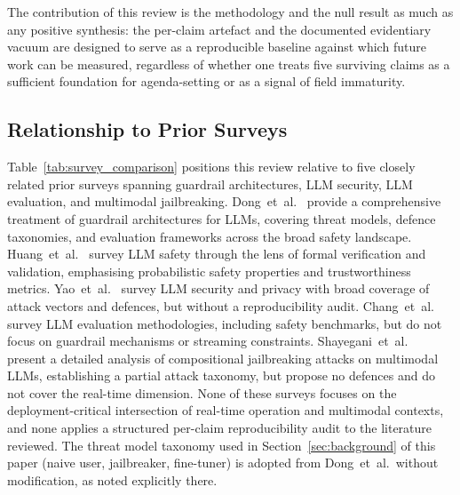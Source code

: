 \noindent The contribution of this review is the methodology and the null result
as much as any positive synthesis: the per-claim artefact and the documented
evidentiary vacuum are designed to serve as a reproducible baseline against which
future work can be measured, regardless of whether one treats five surviving claims
as a sufficient foundation for agenda-setting or as a signal of field immaturity.

\subsection{Relationship to Prior Surveys}

Table~\ref{tab:survey_comparison} positions this review relative to five closely
related prior surveys spanning guardrail architectures, LLM security, LLM evaluation,
and multimodal jailbreaking.
Dong~et~al.~\cite{dong2024building} provide a comprehensive treatment of guardrail
architectures for LLMs, covering threat models, defence taxonomies, and evaluation
frameworks across the broad safety landscape.
Huang~et~al.~\cite{huang2023survey} survey LLM safety through the lens of formal
verification and validation, emphasising probabilistic safety properties and
trustworthiness metrics.
Yao~et~al.~\cite{yao2023survey} survey LLM security and privacy with broad
coverage of attack vectors and defences, but without a reproducibility audit.
Chang~et~al.~\cite{chang2024survey} survey LLM evaluation methodologies, including
safety benchmarks, but do not focus on guardrail mechanisms or streaming constraints.
Shayegani~et~al.~\cite{shayegani2023jailbreak} present a detailed analysis of
compositional jailbreaking attacks on multimodal LLMs, establishing a partial
attack taxonomy, but propose no defences and do not cover the real-time dimension.
None of these surveys focuses on the deployment-critical intersection of real-time
operation and multimodal contexts, and none applies a structured per-claim
reproducibility audit to the literature reviewed.
The threat model taxonomy used in Section~\ref{sec:background} of this paper
(naive user, jailbreaker, fine-tuner) is adopted from Dong~et~al.\ without
modification, as noted explicitly there.

